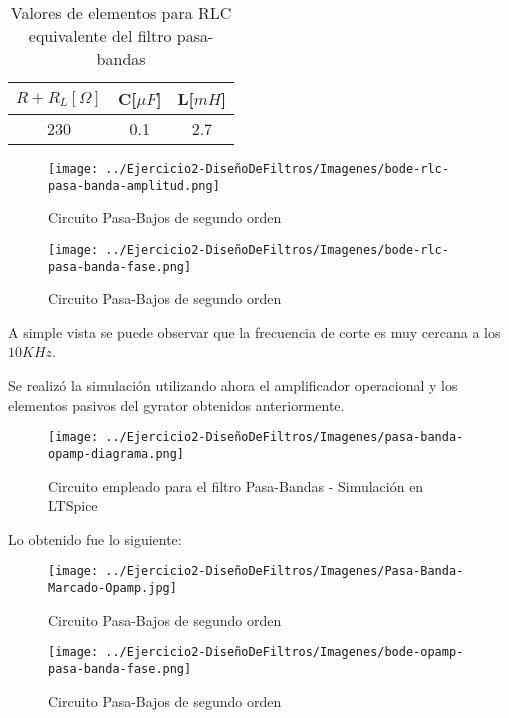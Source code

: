 \begin{table}[H]
    \centering
    \begin{tabular}{|c|c|c|}
    \hline
    \rowcolor[HTML]{C0C0C0} 
    $R+R_L[\Omega]$ & C[$\mu F$] & L[$mH$]  \\ \hline
    230     & 0.1  & 2.7 \\ \hline
    \end{tabular}
    \caption{Valores de elementos para RLC equivalente del filtro pasa-bandas}
    \end{table}


\begin{figure}[H]
    \centering
    \texttt{[image: ../Ejercicio2-DiseñoDeFiltros/Imagenes/bode-rlc-pasa-banda-amplitud.png]}
    \caption{Circuito Pasa-Bajos de segundo orden}
\end{figure}

\begin{figure}[H]
    \centering
    \texttt{[image: ../Ejercicio2-DiseñoDeFiltros/Imagenes/bode-rlc-pasa-banda-fase.png]}
    \caption{Circuito Pasa-Bajos de segundo orden}
\end{figure}

A simple vista se puede observar que la frecuencia de corte es muy cercana a los $10 KHz$.

Se realizó la simulación utilizando ahora el amplificador operacional y los elementos pasivos del gyrator obtenidos anteriormente.

\begin{figure}[H]
    \centering
    \texttt{[image: ../Ejercicio2-DiseñoDeFiltros/Imagenes/pasa-banda-opamp-diagrama.png]}
    \caption{Circuito empleado para el filtro Pasa-Bandas - Simulación en LTSpice}
\end{figure}

Lo obtenido fue lo siguiente:

\begin{figure}[H]
    \centering
    \texttt{[image: ../Ejercicio2-DiseñoDeFiltros/Imagenes/Pasa-Banda-Marcado-Opamp.jpg]}
    \caption{Circuito Pasa-Bajos de segundo orden}
\end{figure}

\begin{figure}[H]
    \centering
    \texttt{[image: ../Ejercicio2-DiseñoDeFiltros/Imagenes/bode-opamp-pasa-banda-fase.png]}
    \caption{Circuito Pasa-Bajos de segundo orden}
\end{figure}

